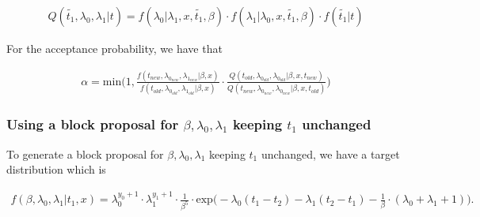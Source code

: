 \begin{align}
    Q(\widetilde{t_1}, \lambda_0, \lambda_1 |t) = f(\lambda_0| \lambda_1, x, \widetilde{t_1}, \beta)\cdot f(\lambda_1| \lambda_0, x, \widetilde{t_1}, \beta)\cdot f(\widetilde{t_1}| t) 
\end{align}

For the acceptance probability, we have that

\begin{align}
    \alpha = \text{min} \Bigg(1,  \frac{
    f(t_{new}, \lambda_{0_{new}}, \lambda_{1_{new}}|\beta, x)}{f(t_{old}, \lambda_{0_{old}}, \lambda_{1_{old}}|\beta, x)}
    \cdot 
    \frac{Q(t_{old}, \lambda_{0_{old}}, \lambda_{0_{old}} | \beta, x, t_{new})}{Q(t_{new}, \lambda_{0_{new}}, \lambda_{0_{new}} | \beta, x, t_{old})} \Bigg) 
\end{align}




\subsubsection{Using a block proposal for $\beta, \lambda_0, \lambda_1$ keeping $t_1$ unchanged}

To generate a block proposal for $\beta, \lambda_0, \lambda_1$ keeping $t_1$ unchanged, we have a target distribution which is 


\begin{align}
    f(\beta, \lambda_0, \lambda_1| t_1, x) = 
    \lambda_0^{y_0 + 1} \cdot \lambda_1^{y_1 + 1} \cdot \frac{1}{\beta^5} \cdot \text{exp}\Bigg(  -\lambda_0(t_1 - t_2) 
    - \lambda_1 (t_2 - t_1 ) 
    - \frac{1}{\beta} \cdot (\lambda_0 + \lambda_1  + 1) \Bigg). 
\end{align}



